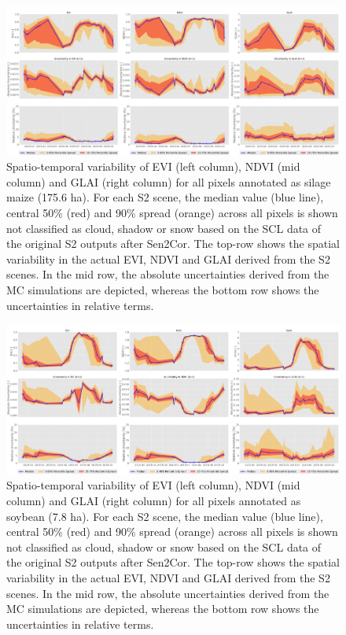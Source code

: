 \begin{figure}[H]
    \centering
    \includegraphics[width=\textwidth]{04-Uncertainty/img/Silage Maize_all-pixels-uncertainty-timeseries.png}
    \caption{Spatio-temporal variability of EVI (left column), NDVI (mid column) and GLAI (right column) for all pixels annotated as silage maize (175.6 ha). For each S2 scene, the median value (blue line), central 50\% (red) and 90\% spread (orange) across all pixels is shown not classified as cloud, shadow or snow based on the SCL data of the original S2 outputs after Sen2Cor. The top-row shows the spatial variability in the actual EVI, NDVI and GLAI derived from the S2 scenes. In the mid row, the absolute uncertainties derived from the MC simulations are depicted, whereas the bottom row shows the uncertainties in relative terms.}
    \label{fig:silage-maize-timeseries-and-uncertainty}
\end{figure}

\begin{figure}[H]
    \centering
    \includegraphics[width=\textwidth]{04-Uncertainty/img/Soybean_all-pixels-uncertainty-timeseries.png}
    \caption{Spatio-temporal variability of EVI (left column), NDVI (mid column) and GLAI (right column) for all pixels annotated as soybean (7.8 ha). For each S2 scene, the median value (blue line), central 50\% (red) and 90\% spread (orange) across all pixels is shown not classified as cloud, shadow or snow based on the SCL data of the original S2 outputs after Sen2Cor. The top-row shows the spatial variability in the actual EVI, NDVI and GLAI derived from the S2 scenes. In the mid row, the absolute uncertainties derived from the MC simulations are depicted, whereas the bottom row shows the uncertainties in relative terms.}
    \label{fig:soybean-timeseries-and-uncertainty}
\end{figure}

